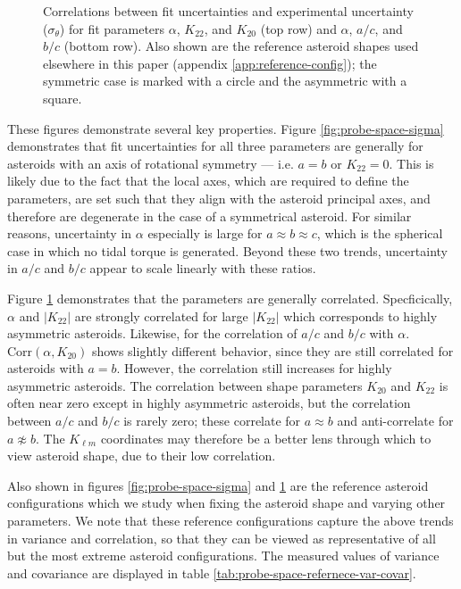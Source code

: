 \documentclass[linenumbers]{aastex631}
\begin{document}
\begin{figure}
  \caption{Correlations between fit uncertainties and experimental uncertainty ($\sigma_\theta$) for fit parameters $\alpha$, $K_{22}$, and $K_{20}$ (top row) and $\alpha$, $a/c$, and $b/c$ (bottom row). Also shown are the reference asteroid shapes used elsewhere in this paper (appendix \ref{app:reference-config}); the symmetric case is marked with a circle and the asymmetric with a square.}
  \label{fig:probe-space-corr}
\end{figure}

These figures demonstrate several key properties. Figure \ref{fig:probe-space-sigma} demonstrates that fit uncertainties for all three parameters are generally for asteroids with an axis of rotational symmetry --- i.e. $a=b$ or $K_{22} = 0$. This is likely due to the fact that the local axes, which are required to define the parameters, are set such that they align with the asteroid principal axes, and therefore are degenerate in the case of a symmetrical asteroid. For similar reasons, uncertainty in $\alpha$ especially is large for $a \approx b \approx c$, which is the spherical case in which no tidal torque is generated. Beyond these two trends, uncertainty in $a/c$ and $b/c$ appear to scale linearly with these ratios. 

Figure \ref{fig:probe-space-corr} demonstrates that the parameters are generally correlated. Specficically, $\alpha$ and $|K_{22}|$ are strongly correlated for large $|K_{22}|$ which corresponds to highly asymmetric asteroids. Likewise, for the correlation of $a/c$ and $b/c$ with $\alpha$. $\mathrm{Corr}(\alpha, K_{20})$ shows slightly different behavior, since they are still correlated for asteroids with $a=b$. However, the correlation still increases for highly asymmetric asteroids. The correlation between shape parameters $K_{20}$ and $K_{22}$ is often near zero except in highly asymmetric asteroids, but the correlation between $a/c$ and $b/c$ is rarely zero; these correlate for $a\approx b$ and anti-correlate for $a \not \approx b$. The $K_{\ell m}$ coordinates may therefore be a better lens through which to view asteroid shape, due to their low correlation.

Also shown in figures \ref{fig:probe-space-sigma} and \ref{fig:probe-space-corr} are the reference asteroid configurations which we study when fixing the asteroid shape and varying other parameters. We note that these reference configurations capture the above trends in variance and correlation, so that they can be viewed as representative of all but the most extreme asteroid configurations. The measured values of variance and covariance are displayed in table \ref{tab:probe-space-refernece-var-covar}.
\end{document}
